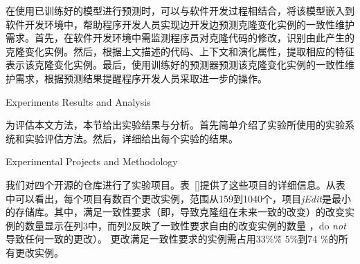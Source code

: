 在使用已训练好的模型进行预测时，可以与软件开发过程相结合，将该模型嵌入到软件开发环境中，帮助程序开发人员实现边开发边预测克隆变化实例的一致性维护需求。首先，在软件开发环境中需监测程序员对克隆代码的修改，识别由此产生的克隆变化实例。然后，根据上文描述的代码、上下文和演化属性，提取相应的特征表示该克隆变化实例。最后，使用训练好的预测器预测该克隆变化实例的一致性维护需求，根据预测结果提醒程序开发人员采取进一步的操作。



{Experiments Results and Analysis}


为评估本文方法，本节给出实验结果与分析。首先简单介绍了实验所使用的实验系统和实验评估方法。然后，详细给出每个实验的结果。

{Experimental Projects and Methodology}

我们对四个开源的仓库进行了实验项目。表~\ref {}提供了这些项目的详细信息。从表中可以看出，每个项目有数百个更改实例，范围从159到1040个，项目{\em  jEdit}是最小的存储库。其中，满足一致性要求（即，导致克隆组在未来一致的改变）的改变实例的数量显示在列3中，而列2反映了一致性要求自由的改变实例的数量 ，do {\em not }导致任何一致的更改）。
更改满足一致性要求的实例需占用33\%\~\% 5\%到74 \%的所有更改实例。

